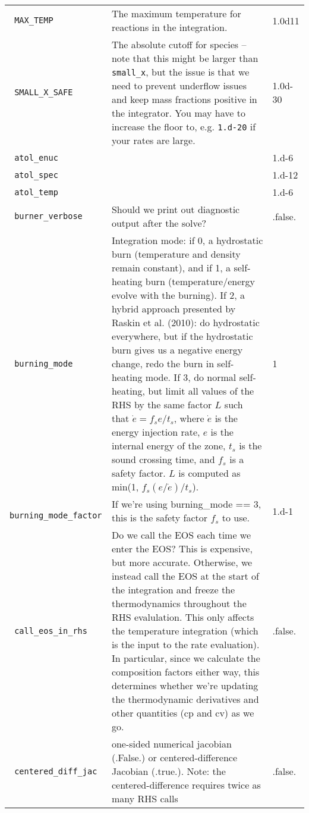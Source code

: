 \begin{landscape}
{\begin{center}
\begin{longtable}{|l|p{5.25in}|l|}
\rowcolor{tableShade}
\verb= MAX_TEMP = &  The maximum temperature for reactions in the integration. & 1.0d11 \\
\verb= SMALL_X_SAFE = &  The absolute cutoff for species -- note that this might be larger than {\tt small\_x}, but the issue is that we need to prevent underflow issues and keep mass fractions positive in the integrator.  You may have to increase the floor to, e.g. {\tt 1.d-20} if your rates are large. & 1.0d-30 \\
\rowcolor{tableShade}
\verb= atol_enuc = &  & 1.d-6 \\
\verb= atol_spec = &  & 1.d-12 \\
\rowcolor{tableShade}
\verb= atol_temp = &  & 1.d-6 \\
\verb= burner_verbose = &  Should we print out diagnostic output after the solve? & .false. \\
\rowcolor{tableShade}
\verb= burning_mode = &  Integration mode: if 0, a hydrostatic burn (temperature and density remain constant), and if 1, a self-heating burn (temperature/energy evolve with the burning). If 2, a hybrid approach presented by Raskin et al. (2010): do hydrostatic everywhere, but if the hydrostatic burn gives us a negative energy change, redo the burn in self-heating mode.  If 3, do normal self-heating, but limit all values of the RHS by the same factor $L$ such that $\dot{e} = f_s e / t_s$, where $\dot{e}$ is the energy injection rate, $e$ is the internal energy of the zone, $t_s$ is the sound crossing time, and $f_s$ is a safety factor. $L$ is computed as min(1, $f_s (e / \dot{e}) / t_s$). & 1 \\
\verb= burning_mode_factor = &  If we're using burning\_mode == 3, this is the safety factor $f_s$ to use. & 1.d-1 \\
\rowcolor{tableShade}
\verb= call_eos_in_rhs = &  Do we call the EOS each time we enter the EOS?  This is expensive, but more accurate.  Otherwise, we instead call the EOS at the start of the integration and freeze the thermodynamics throughout the RHS evalulation.  This only affects the temperature integration (which is the input to the rate evaluation). In particular, since we calculate the composition factors either way, this determines whether we're updating the thermodynamic derivatives and other quantities (cp and cv) as we go. & .false. \\
\verb= centered_diff_jac = &  one-sided numerical jacobian (.False.) or centered-difference Jacobian (.true.).  Note: the centered-difference requires twice as many RHS calls & .false. \\

\end{longtable}
\end{center}}
\end{landscape}
